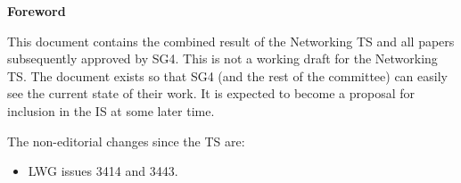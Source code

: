 
% 

\vfill
\textbf{Foreword}

This document contains the combined result of the Networking TS and all
papers subsequently approved by SG4.
This is not a working draft for the Networking TS.
The document exists so that SG4 (and the rest of the committee) can easily
see the current state of their work.
It is expected to become a proposal for inclusion in the IS at some later time.

The non-editorial changes since the TS are:

\begin{itemize}
\item LWG issues 3414 and 3443.
\end{itemize}
\newpage




{}
\hypertarget{toctarget}{\tableofcontents*}

\setcounter{tocdepth}{5}

%
